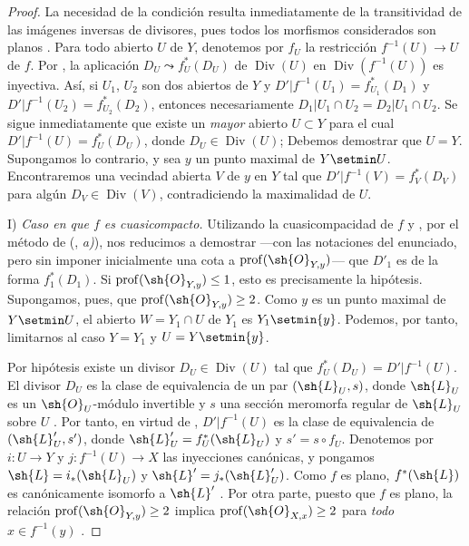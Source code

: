 \begin{proof}
La necesidad de la condición resulta inmediatamente de la transitividad de las
imágenes inversas de divisores, pues todos los morfismos considerados son planos
{}. Para todo abierto $U$ de $Y$, denotemos por $f_U$ la
restricción $f^{-1}(U)\to U$ de $f$. Por {}, la aplicación
$D_U\leadsto f_U^*(D_U)$
de $\operatorname{Div}(U)$ en
$\operatorname{Div}(f^{-1}(U))$ es inyectiva. Así, si $U_1$, $U_2$ son
dos abiertos de $Y$ y
$D'|f^{-1}(U_1)=f_{U_1}^*(D_1)$ y
$D'|f^{-1}(U_2)=f_{U_2}^*(D_2)$,
entonces necesariamente
$D_1|U_1\cap U_2=D_2|U_1\cap U_2$. Se sigue inmediatamente que existe un
\emph{mayor} abierto $U\subset Y$ para el cual
$D'|f^{-1}(U)=f_U^*(D_U)$, donde $D_U\in\operatorname{Div}(U)$;
Debemos demostrar que $U=Y$. Supongamos lo contrario, y sea $y$ un punto
maximal de $Y\setmin U$. Encontraremos una vecindad abierta $V$ de
$y$ en $Y$ tal que
  $D'|f^{-1}(V)=f_V^*(D_V)$ para algún
$D_V\in\operatorname{Div}(V)$, contradiciendo la maximalidad de $U$.

\textup{I)} \emph{Caso en que $f$ es cuasicompacto.}
Utilizando la cuasicompacidad de $f$ y {}, por el método de
({}, \emph{a)}), nos reducimos a demostrar ---con las notaciones del
enunciado, pero sin imponer inicialmente una cota a
$\operatorname{prof}(\sh{O}_{Y,y})$--- que $D'_1$ es de la forma
$f_1^*(D_1)$. Si $\operatorname{prof}(\sh{O}_{Y,y})\leq1$, esto es
precisamente la hipótesis. Supongamos, pues, que
$\operatorname{prof}(\sh{O}_{Y,y})\geq2$. Como $y$ es un punto
maximal de $Y\setmin U$, el abierto $W=Y_1\cap U$ de $Y_1$ es
$Y_1\setmin\{y\}$. Podemos, por tanto, limitarnos al caso
$Y=Y_1$ y $U=Y\setmin\{y\}$.

Por hipótesis existe un divisor $D_U\in\operatorname{Div}(U)$ tal
que $f_U^*(D_U)=D'|f^{-1}(U)$. El divisor $D_U$ es la clase de
equivalencia de un par $(\sh{L}_U,s)$, donde $\sh{L}_U$ es un
$\sh{O}_U$-módulo invertible y $s$ una sección meromorfa regular de
$\sh{L}_U$ sobre $U$ {}. Por tanto, en virtud de
{}, $D'|f^{-1}(U)$ es la clase de equivalencia de
$(\sh{L}'_U,s')$, donde
$\sh{L}'_U=f_U^*(\sh{L}_U)$ y $s'=s\circ f_U$.
Denotemos por $i:U\to Y$ y $j:f^{-1}(U)\to X$ las inyecciones canónicas,
y pongamos
$\sh{L}=i_*(\sh{L}_U)$ y
$\sh{L}'=j_*(\sh{L}'_U)$.
Como $f$ es plano, $f^*(\sh{L})$ es canónicamente isomorfo a
$\sh{L}'$ {}. Por otra parte, puesto que $f$ es plano, la relación
$\operatorname{prof}(\sh{O}_{Y,y})\geq2$ implica
$\operatorname{prof}(\sh{O}_{X,x})\geq2$ para \emph{todo}
$x\in f^{-1}(y)$ {}.


\end{proof}
